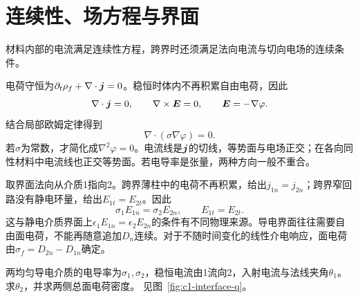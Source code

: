 \section{连续性、场方程与界面}\label{sec:c1-interface}
材料内部的电流满足连续性方程，跨界时还须满足法向电流与切向电场的连续条件。

电荷守恒为$\partial_t\rho_f+\nabla\cdot\bm{j}=0$。稳恒时体内不再积累自由电荷，因此
\[
 \nabla\cdot\bm{j}=0,\qquad
 \nabla\times\bm{E}=0,\qquad \bm{E}=-\nabla\varphi.
\]
结合局部欧姆定律得到
\[
 \boxed{\nabla\cdot(\sigma\nabla\varphi)=0}.
\]
若$\sigma$为常数，才简化成$\nabla^2\varphi=0$。电流线是$\bm{j}$的切线，等势面与电场正交；在各向同性材料中电流线也正交等势面。若电导率是张量，两种方向一般不重合。

取界面法向从介质1指向2。跨界薄柱中的电荷不再积累，给出$j_{1n}=j_{2n}$；跨界窄回路没有静电环量，给出$E_{1t}=E_{2t}$。因此
\[
 \boxed{\sigma_1E_{1n}=\sigma_2E_{2n},\qquad E_{1t}=E_{2t}}.
\]
这与静电介质界面上$\epsilon_1E_{1n}=\epsilon_2E_{2n}$的条件有不同物理来源。导电界面往往需要自由面电荷，不能再随意追加$D_n$连续。对于不随时间变化的线性介电响应，面电荷由$\sigma_f=D_{2n}-D_{1n}$确定。

\begin{example}[电流线在导电界面的折向]\label{ex:c1-interface}
两均匀导电介质的电导率为$\sigma_1,\sigma_2$，稳恒电流由1流向2，入射电流与法线夹角$\theta_1$。求$\theta_2$，并求两侧总面电荷密度。 见图~\ref{fig:c1-interface-q}。
\end{example}

